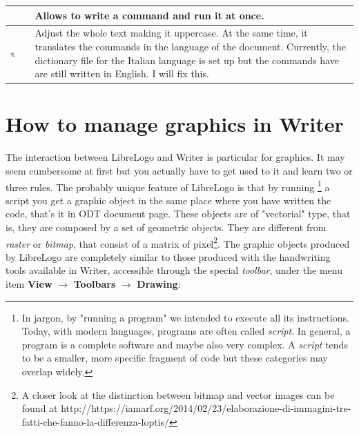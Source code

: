 \begin{center}
\begin{tabular}{ c | l | p{5cm} }
    \includegraphics[width=0.75cm]{./images/librelogo/220px-TextLO.png} &  & Allows to write a command and run it at once.
 \\ \hline
    \includegraphics[width=0.75cm]{./images/librelogo/MagicwLO.png} &  &  Adjust the whole text making it uppercase. At the same time, it translates the commands in the language of the document. Currently, the dictionary file for the Italian language is set up but the commands have are still written in English. I will fix this. \\ \hline
    \hline
  \end{tabular}
\end{center}

\section{How to manage graphics in Writer}

The interaction between LibreLogo and Writer is particular for graphics. It may seem cumbersome at first but you actually have to get used to it and learn two or three rules. The probably unique feature of LibreLogo is that by running \footnote{In jargon, by "running a program" we intended to execute all its instructions. Today, with modern languages, programs are often called \textit{script}. In general, a program is a complete software and maybe also very complex. A \textit{script} tends to be a smaller, more specific fragment of code but these categories may overlap widely.} a script you get a graphic object in the same place where you have written the code, that's it in ODT document page. These objects are of "vectorial" type, that is, they are composed by a set of geometric objects. They are different from \textit{raster} or \textit{bitmap}, that consist of a matrix of pixel\footnote{A closer look at the distinction between bitmap and vector images can be found at http://https://iamarf.org/2014/02/23/elaborazione-di-immagini-tre-fatti-che-fanno-la-differenza-loptis/}. The graphic objects produced by LibreLogo are completely similar to those produced with the handwriting tools available in Writer, accessible through the special \textit{toolbar}, under the menu item \textbf{View} $\rightarrow$ \textbf{Toolbars} $\rightarrow$ \textbf{Drawing}:

